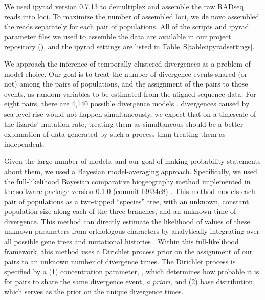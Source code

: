 We used ipyrad version 0.7.13 \citep{ipyrad0713} to demultiplex and assemble
the raw RADseq reads into loci.
To maximize the number of assembled loci, we de novo assembled the reads
separately for each pair of populations.
All of the scripts and ipyrad parameter files we used to assemble the data are
available in our project repository
(),
and the ipyrad settings are listed in
Table~S\ref{table:ipyradsettings}.

We approach the inference of temporally clustered divergences as a problem of
model choice.
Our goal is to treat the number of divergence events shared (or not) among the
pairs of populations, and the assignment of the pairs to those events, as
random variables to be estimated from the aligned sequence data.
For eight pairs, there are 4,140 possible divergence models
\citep[i.e., there are 4,140 ways to partition the eight pairs to $\nevents = 1, 2,
\ldots, 8$ divergence events;][]{Bell1934,Oaks2014dpp,Oaks2018ecoevolity}.
 divergences caused by sea-level rise would not happen simultaneously,
we expect that on a timescale of the lizards' mutation rate, treating them as
simultaneous should be a better explanation of data generated by such a
process than treating them as independent.

Given the large number of models, and our goal of making probability statements
about them, we used a Bayesian model-averaging approach.
Specifically, we used the full-likelihood Bayesian comparative biogeography
method implemented in the software package \ecoevolity version 0.1.0 (commit
b9f34c8) \citep{Oaks2018ecoevolity}.
This method models each pair of populations as a two-tipped ``species'' tree,
with an unknown, constant population size along each of the three branches, and
an unknown time of divergence.
This method can directly estimate the likelihood of values of these unknown
parameters from orthologous  characters by analytically integrating
over all possible gene trees and mutational histories \citep{Bryant2012,
    Oaks2018ecoevolity}.
Within this full-likelihood framework, this method uses a Dirichlet process
prior on the assignment of our pairs to an unknown number of divergence times.
The Dirichlet process is specified by a
(1) concentration parameter, \concentration, which determines how probable it
is for pairs to share the same divergence event, \emph{a priori}, and
(2) base distribution, which serves as the prior on the unique divergence
times.

